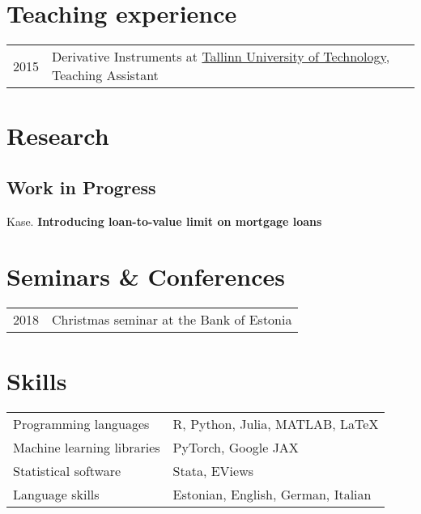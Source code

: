 \documentclass[a4, 11pt]{article}
\begin{document}
    \section*{Teaching experience}
  \begin{table}[H]
      \begin{tabular}{p{2cm}p{14cm}}
          2015 & {Derivative Instruments} at \href{https://www.ttu.ee/en}{Tallinn University of Technology}, Teaching Assistant\\
      \end{tabular}
    \end{table}


    \section*{Research}\subsection*{Work in Progress}
      Kase. \textbf{Introducing loan-to-value limit on mortgage loans}\\


    \section*{Seminars \& Conferences}
\begin{table}[H]
    \begin{tabular}{p{2cm}p{14cm}}
        2018 & {Christmas seminar} at {the Bank of Estonia}\\
    \end{tabular}
  \end{table}


    \section*{Skills}\begin{table}[H]
    \begin{tabular}{p{2cm}p{14cm}}
        Programming languages & R, Python, Julia, MATLAB, LaTeX \\
        Machine learning libraries & PyTorch, Google JAX \\
        Statistical software & Stata, EViews \\
        Language skills & Estonian, English, German, Italian \\
    \end{tabular}
  \end{table}
\end{document}
